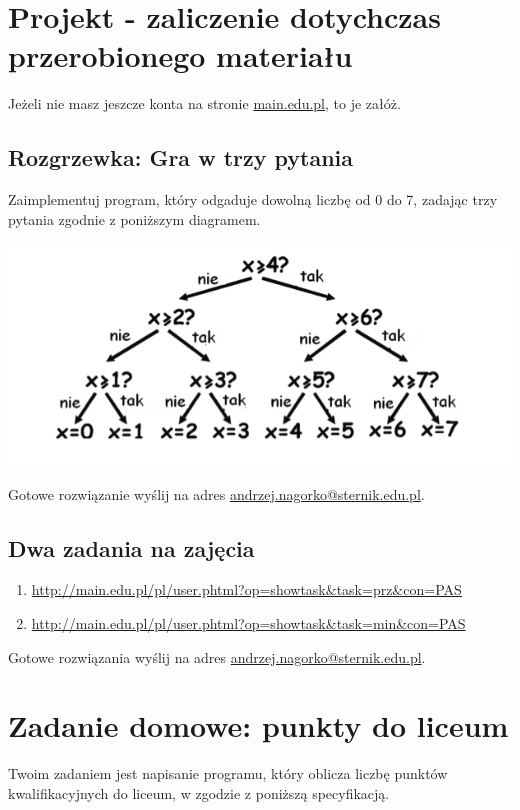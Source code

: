 \documentclass[a4paper,12pt]{scrartcl}
\newcounter{zad}
\begin{document}
\section*{Projekt - zaliczenie dotychczas przerobionego materiału}

Jeżeli nie masz jeszcze konta na stronie \url{main.edu.pl}, to je załóż.

\subsection*{Rozgrzewka: Gra w trzy pytania}

Zaimplementuj program, który odgaduje dowolną liczbę od 0 do 7, zadając trzy pytania
 zgodnie z poniższym diagramem.

\includegraphics[width=\textwidth]{drzewo_3pytania.png}

Gotowe rozwiązanie wyślij na adres \url{andrzej.nagorko@sternik.edu.pl}.

\subsection*{Dwa zadania na zajęcia}

\begin{enumerate}
\item \url{http://main.edu.pl/pl/user.phtml?op=showtask&task=prz&con=PAS}
\item \url{http://main.edu.pl/pl/user.phtml?op=showtask&task=min&con=PAS}
\end{enumerate}

Gotowe rozwiązania wyślij na adres \url{andrzej.nagorko@sternik.edu.pl}.

\newpage
\section*{Zadanie domowe: punkty do liceum}

Twoim zadaniem jest napisanie programu, który oblicza liczbę punktów kwalifikacyjnych do liceum, w zgodzie z poniższą specyfikacją.
\end{document}
